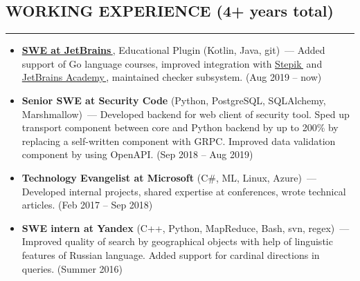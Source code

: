 \documentclass[11pt]{res} %
\let\orighref\href
\renewcommand{\href}[2]{\orighref{#1}{#2\,\faExternalLink}}
\begin{document}
\begin{resume}
\section{\uppercase{Working Experience} (4+ years total)}
\begin{spacing}{0.3}
\textcolor[RGB]{220,220,220}{\rule{\linewidth}{0.4pt}} 
\end{spacing}
\vspace{0.2in}
   \begin{itemize} \itemsep -2pt  %
    \item \textbf{\href{https://github.com/JetBrains/educational-plugin}{SWE at JetBrains}}, Educational Plugin (Kotlin, Java, git)~--- Added support of Go language courses, improved integration with \href{https://stepik.org/}{Stepik} and \href{https://hyperskill.org}{JetBrains Academy}, maintained checker subsystem. (Aug 2019 – now)
   \item {\textbf{Senior SWE at Security Code}} (Python, PostgreSQL, SQLAlchemy, Marshmallow)~--- Developed backend for web client of security tool. Sped up transport component between core and Python backend by up to 200\% by replacing a self-written component with GRPC. Improved data validation component by using OpenAPI. (Sep 2018 – Aug 2019)
   \item {\textbf{Technology Evangelist at Microsoft}} (C\#, ML, Linux, Azure)~--- Developed internal projects, shared expertise at conferences, wrote technical articles. (Feb 2017 – Sep 2018)
   \item {\textbf{SWE intern at Yandex}} (C++, Python, MapReduce, Bash, svn, regex)~--- Improved quality of search by geographical objects with help of linguistic features of Russian language. Added support for cardinal directions in queries. (Summer 2016)
 \end{itemize}


\end{resume}
\end{document}
